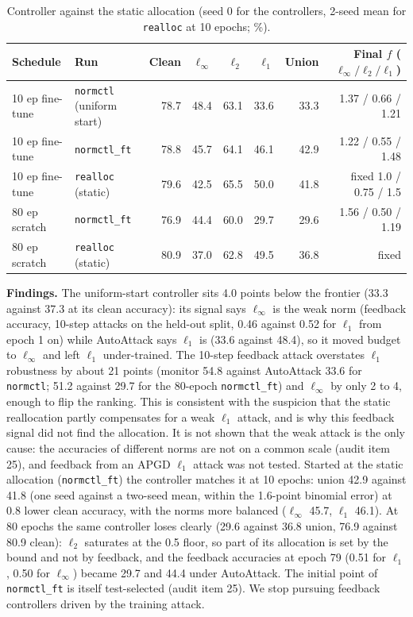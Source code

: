 \documentclass[11pt]{article}
\begin{document}
\begin{table}[h]\centering\small
\caption{Controller against the static allocation (seed 0 for the controllers, 2-seed mean for \texttt{realloc} at 10 epochs; \%).}\label{tab:ctl}
\begin{tabular}{llrrrrrr}\toprule
Schedule & Run & Clean & $\ell_\infty$ & $\ell_2$ & $\ell_1$ & Union & Final $f$ ($\ell_\infty/\ell_2/\ell_1$)\\\midrule
10 ep fine-tune & \texttt{normctl} (uniform start) & 78.7 & 48.4 & 63.1 & 33.6 & 33.3 & 1.37 / 0.66 / 1.21\\
10 ep fine-tune & \texttt{normctl\_ft} & 78.8 & 45.7 & 64.1 & 46.1 & 42.9 & 1.22 / 0.55 / 1.48\\
10 ep fine-tune & \texttt{realloc} (static) & 79.6 & 42.5 & 65.5 & 50.0 & 41.8 & fixed 1.0 / 0.75 / 1.5\\\midrule
80 ep scratch & \texttt{normctl\_ft} & 76.9 & 44.4 & 60.0 & 29.7 & 29.6 & 1.56 / 0.50 / 1.19\\
80 ep scratch & \texttt{realloc} (static) & 80.9 & 37.0 & 62.8 & 49.5 & 36.8 & fixed\\\bottomrule
\end{tabular}
\end{table}

\textbf{Findings.} The uniform-start controller sits 4.0 points below the frontier (33.3 against 37.3 at its clean accuracy): its signal says $\ell_\infty$ is the weak norm
(feedback accuracy, 10-step attacks on the held-out split, 0.46 against 0.52 for $\ell_1$ from epoch 1 on) while AutoAttack says $\ell_1$ is (33.6 against 48.4), so it moved budget to $\ell_\infty$ and left $\ell_1$ under-trained.
The 10-step feedback attack overstates $\ell_1$ robustness by about 21 points (monitor 54.8 against AutoAttack 33.6 for \texttt{normctl}; 51.2 against 29.7 for the 80-epoch \texttt{normctl\_ft}) and $\ell_\infty$ by only 2 to 4, enough to flip the ranking. This is consistent with the suspicion that the static reallocation partly compensates for a weak $\ell_1$ attack, and is why this feedback signal did not find the allocation. It is not shown that the weak attack is the only cause: the accuracies of different norms are not on a common scale (audit item 25), and feedback from an APGD $\ell_1$ attack was not tested.
Started at the static allocation (\texttt{normctl\_ft}) the controller matches it at 10 epochs: union 42.9 against 41.8 (one seed against a two-seed mean, within the 1.6-point binomial error) at 0.8 lower clean accuracy, with the norms more balanced ($\ell_\infty$ 45.7, $\ell_1$ 46.1).
At 80 epochs the same controller loses clearly (29.6 against 36.8 union, 76.9 against 80.9 clean): $\ell_2$ saturates at the 0.5 floor, so part of its allocation is set by the bound and not by feedback,
and the feedback accuracies at epoch 79 (0.51 for $\ell_1$, 0.50 for $\ell_\infty$) became 29.7 and 44.4 under AutoAttack. The initial point of \texttt{normctl\_ft} is itself test-selected (audit item 25).
We stop pursuing feedback controllers driven by the training attack.
\end{document}
